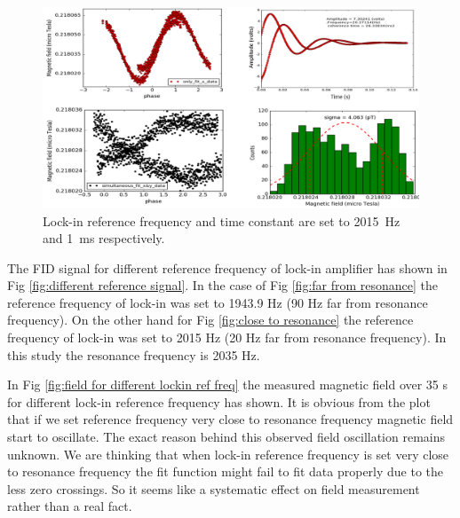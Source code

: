   \begin{figure}[h]
\centering\includegraphics[width=0.8\linewidth]{figures/freq_2015_simultaneous_fit_1ms.png}
\caption{Lock-in reference frequency and time constant are set to 2015~Hz and 1~ms respectively. \label{fig:freq_2015_1ms}}
\end{figure}


 
  The FID signal for different reference frequency of lock-in amplifier has shown in Fig \ref{fig:different reference signal}. In the case of Fig \ref{fig:far from resonance} the reference frequency of lock-in was set to 1943.9 Hz (90 Hz far from resonance frequency). On the other hand for Fig \ref{fig:close to resonance} the reference frequency of lock-in was set to 2015 Hz (20 Hz far from resonance frequency). In this study the resonance frequency is 2035 Hz. 
  
  In Fig \ref{fig:field for different lockin ref freq} the measured magnetic field over 35 s for different lock-in reference frequency has shown. It is obvious from the plot that if we set reference frequency very close to resonance frequency magnetic field start to oscillate. The exact reason behind this observed field oscillation remains unknown. We are thinking that when lock-in reference frequency is set very close to resonance frequency the fit function might fail to fit data properly due to the less zero crossings. So it seems like a systematic effect on field measurement rather than a real fact.
   
